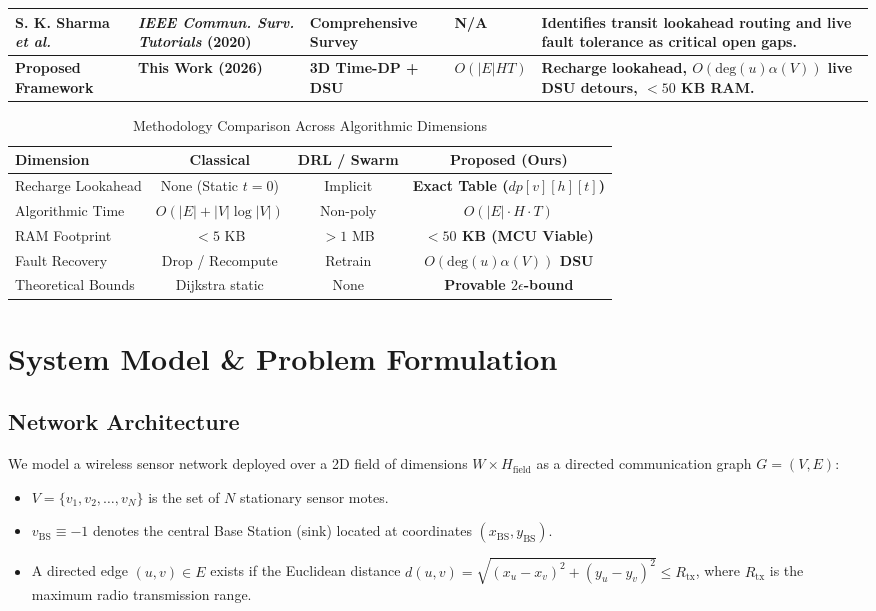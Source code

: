 \documentclass[journal]{IEEEtran}
\begin{document}
\begin{table}[!t]
\begin{tabular}{@{}llllp{5.8cm}@{}}
S. K. Sharma \textit{et al.} \cite{sharma2020energy} & \textit{IEEE Commun. Surv. Tutorials} (2020) & Comprehensive Survey & N/A & Identifies transit lookahead routing and live fault tolerance as critical open gaps. \\
\midrule
\textbf{Proposed Framework} & \textbf{This Work (2026)} & \textbf{3D Time-DP + DSU} & \textbf{$O(|E|HT)$} & \textbf{Recharge lookahead, $O(\text{deg}(u)\alpha(V))$ live DSU detours, $<50$ KB RAM.} \\
\bottomrule
\end{tabular}
\end{table}

\begin{table}[!t]
\caption{Methodology Comparison Across Algorithmic Dimensions}
\label{tab:method_comparison}
\centering
\begin{tabular}{@{}lccc@{}}
\toprule
\textbf{Dimension} & \textbf{Classical} & \textbf{DRL / Swarm} & \textbf{Proposed (Ours)} \\
\midrule
Recharge Lookahead & None (Static $t=0$) & Implicit & \textbf{Exact Table ($dp[v][h][t]$)} \\
Algorithmic Time & $O(|E| + |V|\log |V|)$ & Non-poly & \textbf{$O(|E| \cdot H \cdot T)$} \\
RAM Footprint & $< 5$ KB & $> 1$ MB & \textbf{$< 50$ KB (MCU Viable)} \\
Fault Recovery & Drop / Recompute & Retrain & \textbf{$O(\text{deg}(u)\alpha(V))$ DSU} \\
Theoretical Bounds & Dijkstra static & None & \textbf{Provable $2\epsilon$-bound} \\
\bottomrule
\end{tabular}
\end{table}

\section{System Model \& Problem Formulation}

\subsection{Network Architecture}
We model a wireless sensor network deployed over a 2D field of dimensions $W \times H_{\text{field}}$ as a directed communication graph $G = (V, E)$:
\begin{itemize}
    \item $V = \{v_1, v_2, \dots, v_N\}$ is the set of $N$ stationary sensor motes.
    \item $v_{\text{BS}} \equiv -1$ denotes the central Base Station (sink) located at coordinates $(x_{\text{BS}}, y_{\text{BS}})$.
    \item A directed edge $(u, v) \in E$ exists if the Euclidean distance $d(u, v) = \sqrt{(x_u - x_v)^2 + (y_u - y_v)^2} \le R_{\text{tx}}$, where $R_{\text{tx}}$ is the maximum radio transmission range.
\end{itemize}
\end{document}
